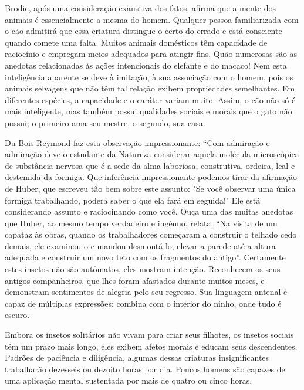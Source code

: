 \documentclass[11pt,a5paper,twoside,openany]{book}
\begin{document}
Brodie, após uma consideração exaustiva dos fatos, afirma que a mente dos animais é essencialmente a mesma do homem. Qualquer pessoa familiarizada com o cão admitirá que essa criatura distingue o certo do errado e está consciente quando comete uma falta. Muitos animais domésticos têm capacidade de raciocínio e empregam meios adequados para atingir fins. Quão numerosas são as anedotas relacionadas às ações intencionais do elefante e do macaco! Nem esta inteligência aparente se deve à imitação, à sua associação com o homem, pois os animais selvagens que não têm tal relação exibem propriedades semelhantes. Em diferentes espécies, a capacidade e o caráter variam muito. Assim, o cão não só é mais inteligente, mas também possui qualidades sociais e morais que o gato não possui; o primeiro ama seu mestre, o segundo, sua casa.

Du Bois-Reymond faz esta observação impressionante: “Com admiração e admiração deve o estudante da Natureza considerar aquela molécula microscópica de substância nervosa que é a sede da alma laboriosa, construtiva, ordeira, leal e destemida da formiga. Que inferência impressionante podemos tirar da afirmação de Huber, que escreveu tão bem sobre este assunto: "Se você observar uma única formiga trabalhando, poderá saber o que ela fará em seguida!" Ele está considerando assunto e raciocinando como você. Ouça uma das muitas anedotas que Huber, ao mesmo tempo verdadeiro e ingênuo, relata: “Na visita de um capataz às obras, quando os trabalhadores começaram a construir o telhado cedo demais, ele examinou-o e mandou desmontá-lo, elevar a parede até a altura adequada e construir um novo teto com os fragmentos do antigo”. Certamente estes insetos não são autômatos, eles mostram intenção. Reconhecem os seus antigos companheiros, que lhes foram afastados durante muitos meses, e demonstram sentimentos de alegria pelo seu regresso. Sua linguagem antenal é capaz de múltiplas expressões; combina com o interior do ninho, onde tudo é escuro.

Embora os insetos solitários não vivam para criar seus filhotes, os insetos sociais têm um prazo mais longo, eles exibem afetos morais e educam seus descendentes. Padrões de paciência e diligência, algumas dessas criaturas insignificantes trabalharão dezesseis ou dezoito horas por dia. Poucos homens são capazes de uma aplicação mental sustentada por mais de quatro ou cinco horas.
\end{document}

